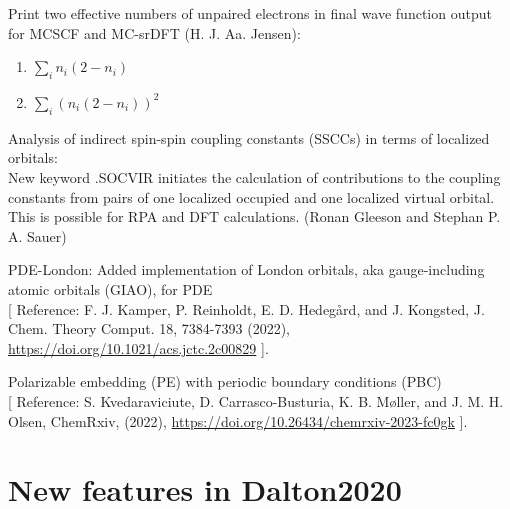 \begin{description}
 \item Print two effective numbers of unpaired electrons in final wave function output for MCSCF and MC-srDFT (H. J. Aa. Jensen):
  \begin{enumerate}
   \item $\sum_i  n_i (2 - n_i)$
   \item $\sum_i (n_i (2 - n_i))^2$
  \end{enumerate}
 \item Analysis of indirect spin-spin coupling constants (SSCCs) in terms of localized orbitals: \\
    New keyword .SOCVIR initiates the calculation of contributions to the coupling constants from pairs of one localized occupied and one localized virtual orbital. This is possible for RPA and DFT calculations. (Ronan Gleeson and Stephan P. A. Sauer)
 \item PDE-London: Added implementation of London orbitals, aka gauge-including atomic orbitals (GIAO), for PDE \\ {}
  [ Reference: F. J. Kamper, P. Reinholdt, E. D. Hedegård, and J. Kongsted, J. Chem. Theory Comput. 18, 7384-7393 (2022), \url{https://doi.org/10.1021/acs.jctc.2c00829} ].
 \item Polarizable embedding (PE) with periodic boundary conditions (PBC) \\ {}
  [ Reference: S. Kvedaraviciute, D. Carrasco-Busturia, K. B. Møller, and J. M. H. Olsen, ChemRxiv, (2022), \url{https://doi.org/10.26434/chemrxiv-2023-fc0gk} ].

\end{description}

\section{New features in Dalton2020}

